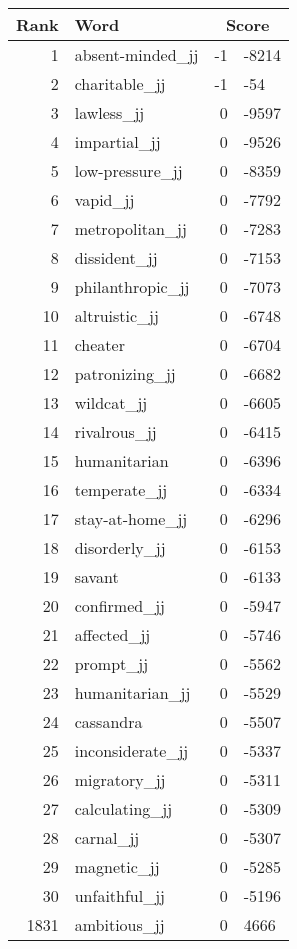 \begin{longtable}[!htbp]{| rlr@{.}l |}
    \hline
    \textbf{Rank} & \textbf{Word} & \multicolumn{2}{c|}{\textbf{Score}} \\
    \hline
    \endhead
    1 & absent-minded\_jj & -1 & -8214 \\
    2 & charitable\_jj & -1 & -54 \\
    3 & lawless\_jj & 0 & -9597 \\
    4 & impartial\_jj & 0 & -9526 \\
    5 & low-pressure\_jj & 0 & -8359 \\
    6 & vapid\_jj & 0 & -7792 \\
    7 & metropolitan\_jj & 0 & -7283 \\
    8 & dissident\_jj & 0 & -7153 \\
    9 & philanthropic\_jj & 0 & -7073 \\
    10 & altruistic\_jj & 0 & -6748 \\
    11 & cheater & 0 & -6704 \\
    12 & patronizing\_jj & 0 & -6682 \\
    13 & wildcat\_jj & 0 & -6605 \\
    14 & rivalrous\_jj & 0 & -6415 \\
    15 & humanitarian & 0 & -6396 \\
    16 & temperate\_jj & 0 & -6334 \\
    17 & stay-at-home\_jj & 0 & -6296 \\
    18 & disorderly\_jj & 0 & -6153 \\
    19 & savant & 0 & -6133 \\
    20 & confirmed\_jj & 0 & -5947 \\
    21 & affected\_jj & 0 & -5746 \\
    22 & prompt\_jj & 0 & -5562 \\
    23 & humanitarian\_jj & 0 & -5529 \\
    24 & cassandra & 0 & -5507 \\
    25 & inconsiderate\_jj & 0 & -5337 \\
    26 & migratory\_jj & 0 & -5311 \\
    27 & calculating\_jj & 0 & -5309 \\
    28 & carnal\_jj & 0 & -5307 \\
    29 & magnetic\_jj & 0 & -5285 \\
    30 & unfaithful\_jj & 0 & -5196 \\
    1831 & ambitious\_jj & 0 & 4666 \\

\end{longtable}
